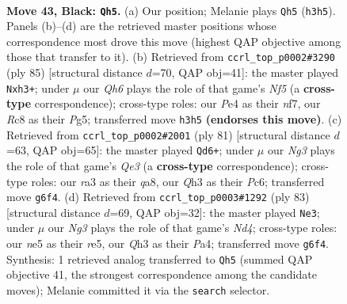 \documentclass[11pt]{article}
\begin{document}
\clearpage

\begin{figure}[p]\centering
\begin{subfigure}{0.46\textwidth}\centering
\resizebox{\linewidth}{!}{%
\newchessgame
\chessboard[
  setfen={2r3k1/6p1/1p4n1/r2pN3/P3p3/R6q/2P2P2/3R2K1 b - - 1 43},
  showmover=false,
  pgfstyle=straightmove, color=movearrow, markmove={h3-h5}
]}
\caption{}
\end{subfigure}\hfill
\begin{subfigure}{0.46\textwidth}\centering
\resizebox{\linewidth}{!}{%
\newchessgame
\chessboard[
  setfen={1k2r3/r3PN2/3P1p2/6p1/1p2RnPp/7P/p4K2/3R4 b - - 1 43},
  showmover=false,
  pgfstyle=straightmove, color=movearrow, markmove={f4-h3}
]}
\caption{}
\end{subfigure}
\\[4pt]
\begin{subfigure}{0.46\textwidth}\centering
\resizebox{\linewidth}{!}{%
\newchessgame
\chessboard[
  setfen={Q7/7k/2p1q3/1n1p2pP/3P2N1/5p1P/R3rP1K/8 b - - 0 41},
  showmover=false,
  pgfstyle=straightmove, color=movearrow, markmove={e6-d6}
]}
\caption{}
\end{subfigure}\hfill
\begin{subfigure}{0.46\textwidth}\centering
\resizebox{\linewidth}{!}{%
\newchessgame
\chessboard[
  setfen={8/2p1N2k/6pp/3nR3/p1p5/P2r2PK/1P5P/8 b - - 1 42},
  showmover=false,
  pgfstyle=straightmove, color=movearrow, markmove={d5-e3}
]}
\caption{}
\end{subfigure}
\caption{\textbf{Move 43, Black: \texttt{Qh5}.} (a) Our position; Melanie plays \texttt{Qh5} (\texttt{h3h5}). Panels (b)--(d) are the retrieved master positions whose correspondence most drove this move (highest QAP objective among those that transfer to it). (b) Retrieved from \texttt{ccrl\_top\_p0002\#3290} (ply 85) [structural distance $d$=70, QAP obj=41]: the master played \texttt{Nxh3+}; under $\mu$ our \emph{Qh6} plays the role of that game's \emph{Nf5} (a \textbf{cross-type} correspondence); cross-type roles: our \emph{P}e4 as their \emph{n}f7, our \emph{R}c8 as their \emph{P}g5; transferred move \texttt{h3h5} \textbf{(endorses this move)}. (c) Retrieved from \texttt{ccrl\_top\_p0002\#2001} (ply 81) [structural distance $d$=63, QAP obj=65]: the master played \texttt{Qd6+}; under $\mu$ our \emph{Ng3} plays the role of that game's \emph{Qe3} (a \textbf{cross-type} correspondence); cross-type roles: our \emph{r}a3 as their \emph{q}a8, our \emph{Q}h3 as their \emph{P}c6; transferred move \texttt{g6f4}. (d) Retrieved from \texttt{ccrl\_top\_p0003\#1292} (ply 83) [structural distance $d$=69, QAP obj=32]: the master played \texttt{Ne3}; under $\mu$ our \emph{Ng3} plays the role of that game's \emph{Nd4}; cross-type roles: our \emph{n}e5 as their \emph{r}e5, our \emph{Q}h3 as their \emph{P}a4; transferred move \texttt{g6f4}. Synthesis: 1 retrieved analog transferred to \texttt{Qh5} (summed QAP objective 41, the strongest correspondence among the candidate moves); Melanie committed it via the \texttt{search} selector.}
\label{fig:thought-m85}
\end{figure}
\end{document}
